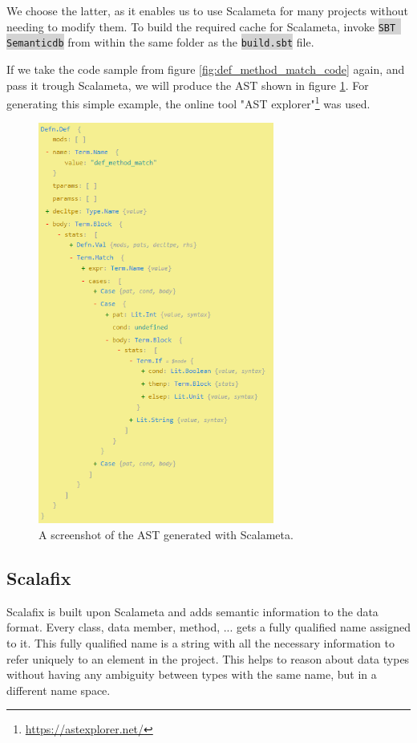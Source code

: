\documentclass[onecolumn]{article}
\newcommand{\code}[1]{\colorbox{lightgray}{\texttt{#1}}}
\begin{document}
We choose the latter, as it enables us to use Scalameta for many projects without needing to modify them. To build the required cache for Scalameta, invoke \code{SBT Semanticdb} from within the same folder as the \code{build.sbt} file.

If we take the code sample from figure \ref{fig:def_method_match_code} again, and pass it trough Scalameta, we will produce the AST shown in figure \ref{fig:def_method_match_AST}. For generating this simple example, the online tool "AST explorer"\footnote{\url{https://astexplorer.net/}} was used.

\begin{figure}[H]
  \centering
  \includegraphics[width=220pt]{fig/def_method_match_AST.PNG}
  \caption{A screenshot of the AST generated with Scalameta.}
  \label{fig:def_method_match_AST}
\end{figure}


\subsection{Scalafix} \label{section_scalafix}
Scalafix is built upon Scalameta and adds semantic information to the data format. Every class, data member, method, ... gets a fully qualified name assigned to it. This fully qualified name is a string with all the necessary information to refer uniquely to an element in the project. This helps to reason about data types without having any ambiguity between types with the same name, but in a different name space.
\end{document}
